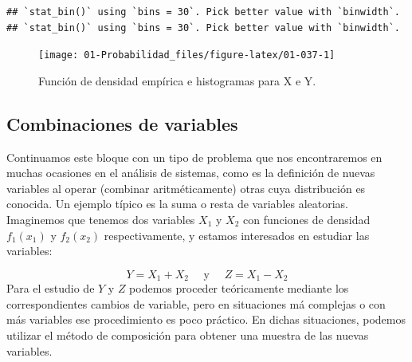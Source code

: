\documentclass[
]{book}
\theoremstyle{definition}
\theoremstyle{definition}
\theoremstyle{definition}
\theoremstyle{definition}
\theoremstyle{remark}
\begin{document}
\begin{verbatim}
## `stat_bin()` using `bins = 30`. Pick better value with `binwidth`.
## `stat_bin()` using `bins = 30`. Pick better value with `binwidth`.
\end{verbatim}

\begin{figure}

{\centering \texttt{[image: 01-Probabilidad\_files/figure-latex/01-037-1]} 

}

\caption{Función de densidad empírica e histogramas para X e Y.}\label{fig:01-037}
\end{figure}

\hypertarget{combinaciones-de-variables}{%
\subsection{Combinaciones de variables}\label{combinaciones-de-variables}}

Continuamos este bloque con un tipo de problema que nos encontraremos en muchas ocasiones en el análisis de sistemas, como es la definición de nuevas variables al operar (combinar aritméticamente) otras cuya distribución es conocida. Un ejemplo típico es la suma o resta de variables aleatorias. Imaginemos que tenemos dos variables \(X_1\) y \(X_2\) con funciones de densidad \(f_1(x_1)\) y \(f_2(x_2)\) respectivamente, y estamos interesados en estudiar las variables:

\[Y = X_1 + X_2 \quad\text{ y } \quad Z = X_1 - X_2\] Para el estudio de \(Y\) y \(Z\) podemos proceder teóricamente mediante los correspondientes cambios de variable, pero en situaciones má complejas o con más variables ese procedimiento es poco práctico. En dichas situaciones, podemos utilizar el método de composición para obtener una muestra de las nuevas variables.
\end{document}
